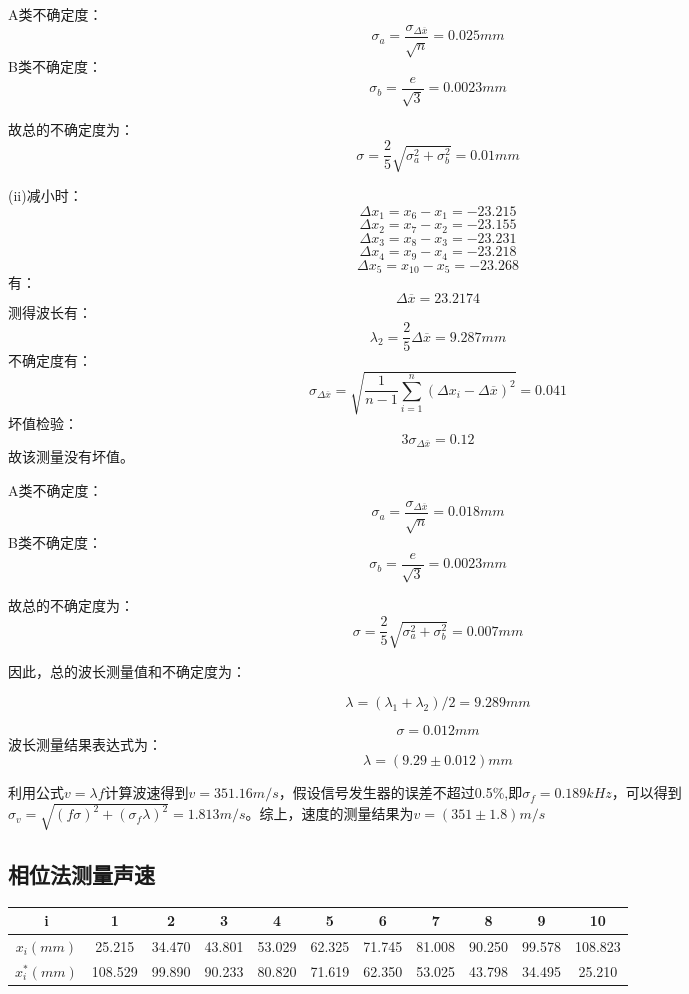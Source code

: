 \documentclass[a4paper, 10pt]{article}
\begin{document}
\noindent A类不确定度：
$$\sigma_a=\frac{\sigma_{\Delta \overline{x}}}{\sqrt{n}}=0.025mm$$
B类不确定度：
$$\sigma_b=\frac{e}{\sqrt{3}}=0.0023mm$$

\noindent 故总的不确定度为：
$$\sigma=\frac{2}{5}\sqrt{\sigma_a^2+\sigma_b^2}=0.01mm$$

\noindent (ii)减小时：
$$\Delta x_1=x_6-x_1=-23.215$$
$$\Delta x_2=x_7-x_2=-23.155$$
$$\Delta x_3=x_8-x_3=-23.231$$
$$\Delta x_4=x_9-x_4=-23.218$$
$$\Delta x_5=x_{10}-x_5=-23.268$$
有：
$$\Delta \overline{x}=23.2174$$
测得波长有：
$$\lambda_2=\frac{2}{5}\Delta \overline{x}=9.287mm$$
不确定度有：
$$\sigma_{\Delta \overline{x}}=\sqrt{\frac{1}{n-1}\sum_{i=1}^n(\Delta x_i-\Delta \overline{x})^2}=0.041$$
坏值检验：
$$3\sigma_{\Delta \overline{x}}=0.12$$
故该测量没有坏值。

\noindent A类不确定度：
$$\sigma_a=\frac{\sigma_{\Delta \overline{x}}}{\sqrt{n}}=0.018mm$$
B类不确定度：
$$\sigma_b=\frac{e}{\sqrt{3}}=0.0023mm$$

\noindent 故总的不确定度为：
$$\sigma=\frac{2}{5}\sqrt{\sigma_a^2+\sigma_b^2}=0.007mm$$

\noindent 因此，总的波长测量值和不确定度为：

$$\lambda=(\lambda_1+\lambda_2)/2=9.289mm$$

$$\sigma=0.012mm$$
波长测量结果表达式为：
$$\lambda=(9.29\pm0.012)mm$$

\noindent 利用公式$v=\lambda f$计算波速得到$v=351.16m/s$，假设信号发生器的误差不超过0.5\%,即$\sigma_f=0.189kHz$，可以得到$\sigma_v=\sqrt{(f\sigma)^2+(\sigma_f \lambda)^2}=1.813m/s$。综上，速度的测量结果为$v=(351\pm1.8)m/s$

\subsection{相位法测量声速}
\begin{center}
    \begin{tabular}{|c|c|c|c|c|c|c|c|c|c|c|}
        \hline
        i&1&2&3&4&5&6&7&8&9&10\\
        \hline
        $x_i(mm)$&25.215&34.470&43.801&53.029&62.325&71.745&81.008&90.250&99.578&108.823\\
        \hline
        
        $x_i^*(mm)$&108.529&99.890&90.233&80.820&71.619&62.350&53.025&43.798&34.495&25.210\\
        \hline
        
    \end{tabular}
    \end{center}
\end{document}
